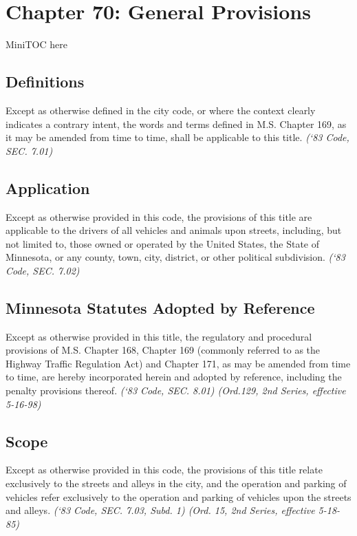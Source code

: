 %
\chapter*{Chapter 70: \newline
	General Provisions}

MiniTOC here
\pagebreak

\section{Definitions}
Except as otherwise defined in the city code, or where the context clearly indicates a contrary intent, the words and terms defined in M.S. Chapter 169, as it may be amended from time to time, shall be applicable to this title.\newline
\emph{(‘83 Code, SEC. 7.01)}
\section{Application}
Except as otherwise provided in this code, the provisions of this title are applicable to the drivers of all vehicles and animals upon streets, including, but not limited to, those owned or operated by the United States, the State of Minnesota, or any county, town, city, district, or other political subdivision.\newline
\emph{(‘83 Code, SEC. 7.02)}
\section{Minnesota Statutes Adopted by Reference}
Except as otherwise provided in this title, the regulatory and procedural provisions of M.S. Chapter 168, Chapter 169 (commonly referred to as the Highway Traffic Regulation Act) and Chapter 171, as may be amended from time to time, are hereby incorporated herein and adopted by reference, including the penalty provisions thereof.\newline
\emph{(‘83 Code, SEC. 8.01) (Ord.129, 2nd Series, effective 5-16-98)}
\section{Scope}
Except as otherwise provided in this code, the provisions of this title relate exclusively to the streets and alleys in the city, and the operation and parking of vehicles refer exclusively to the operation and parking of vehicles upon the streets and alleys.\newline
\emph{(‘83 Code, SEC. 7.03, Subd. 1) (Ord. 15, 2nd Series, effective 5-18-85)}
